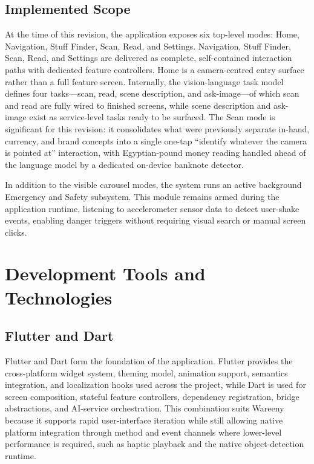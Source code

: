 \documentclass[12pt,a4paper]{report}
\begin{document}
\subsection{Implemented Scope}
At the time of this revision, the application exposes six top-level modes: Home, Navigation, Stuff Finder, Scan, Read, and Settings. Navigation, Stuff Finder, Scan, Read, and Settings are delivered as complete, self-contained interaction paths with dedicated feature controllers. Home is a camera-centred entry surface rather than a full feature screen. Internally, the vision-language task model defines four tasks---scan, read, scene description, and ask-image---of which scan and read are fully wired to finished screens, while scene description and ask-image exist as service-level tasks ready to be surfaced. The Scan mode is significant for this revision: it consolidates what were previously separate in-hand, currency, and brand concepts into a single one-tap ``identify whatever the camera is pointed at'' interaction, with Egyptian-pound money reading handled ahead of the language model by a dedicated on-device banknote detector.

In addition to the visible carousel modes, the system runs an active background Emergency and Safety subsystem. This module remains armed during the application runtime, listening to accelerometer sensor data to detect user-shake events, enabling danger triggers without requiring visual search or manual screen clicks.

\section{Development Tools and Technologies}
\subsection{Flutter and Dart}
Flutter and Dart form the foundation of the application. Flutter provides the cross-platform widget system, theming model, animation support, semantics integration, and localization hooks used across the project, while Dart is used for screen composition, stateful feature controllers, dependency registration, bridge abstractions, and AI-service orchestration. This combination suits Wareeny because it supports rapid user-interface iteration while still allowing native platform integration through method and event channels where lower-level performance is required, such as haptic playback and the native object-detection runtime.
\end{document}
